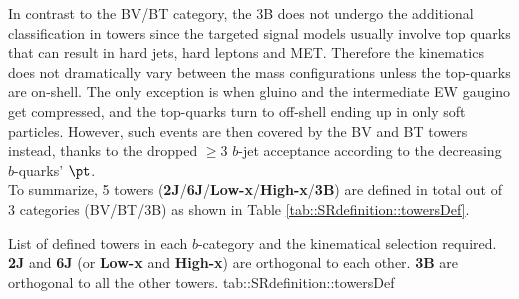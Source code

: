 In contrast to the BV/BT category, the 3B does not undergo the additional classification in towers since the targeted signal models usually involve top quarks that can result in hard jets, hard leptons and MET. 
Therefore the kinematics does not dramatically vary between the mass configurations unless the top-quarks are on-shell.
The only exception is when gluino and the intermediate EW gaugino get compressed, and the top-quarks turn to off-shell ending up in only soft particles.
However, such events are then covered by the BV and BT towers instead, thanks to the dropped $\geq 3$ $b$-jet acceptance according to the decreasing $b$-quarks' $\pt$. \\ 

To summarize, 5 towers (\textbf{2J}/\textbf{6J}/\textbf{Low-x}/\textbf{High-x}/\textbf{3B}) are defined in total out of 3 categories (BV/BT/3B) as shown in Table \ref{tab::SRdefinition::towersDef}. 


{List of defined towers in each $b$-category and the kinematical selection required. \textbf{2J} and \textbf{6J} (or \textbf{Low-x} and \textbf{High-x}) are orthogonal to each other. \textbf{3B} are orthogonal to all the other towers.}
{tab::SRdefinition::towersDef}


\clearpage
